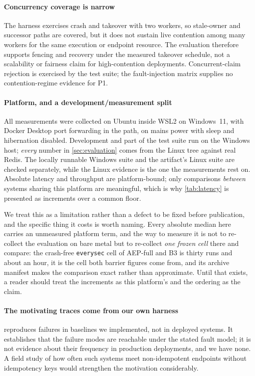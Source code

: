 \paragraph{Concurrency coverage is narrow} The harness exercises crash and
takeover with two workers, so stale-owner and successor paths are covered, but
it does not sustain live contention among many workers for the same execution or
endpoint resource. The evaluation therefore supports fencing and recovery under
the measured takeover schedule, not a scalability or fairness claim for
high-contention deployments. Concurrent-claim rejection is exercised by the test
suite; the fault-injection matrix supplies no contention-regime evidence for P1.

\paragraph{Platform, and a development/measurement split} All measurements were
collected on Ubuntu inside WSL2 on Windows~11, with Docker Desktop port
forwarding in the path, on mains power with sleep and hibernation disabled.
Development and part of the test suite run on the Windows host; \emph{every}
number in \cref{sec:evaluation} comes from the Linux tree against real Redis.
The locally runnable Windows suite and the artifact's Linux suite are checked
separately, while the Linux evidence is the one the measurements rest on.
Absolute latency and throughput are platform-bound; only comparisons
\emph{between} systems sharing this platform are meaningful, which is why
\cref{tab:latency} is presented as increments over a common floor.

We treat this as a limitation rather than a defect to be fixed before
publication, and the specific thing it costs is worth naming. Every absolute
median here carries an unmeasured platform term, and the way to measure it is
not to re-collect the evaluation on bare metal but to re-collect \emph{one frozen
cell} there and compare: the crash-free \texttt{everysec} cell of AEP-full and
B3 is thirty runs and about an hour, it is the cell both barrier figures come
from, and its archive manifest makes the comparison exact rather than
approximate. Until that exists, a reader should treat the increments as this
platform's and the ordering as the claim.

\paragraph{The motivating traces come from our own harness} 
reproduces failures in baselines we implemented, not in deployed systems. It
establishes that the failure modes are reachable under the stated fault model;
it is not evidence about their frequency in production deployments, and we have
none. A field study of how often such systems meet non-idempotent endpoints
without idempotency keys would strengthen the motivation considerably.

